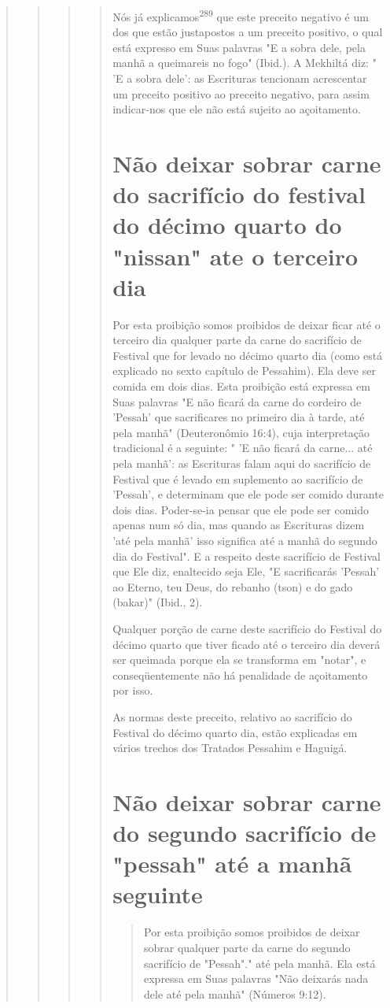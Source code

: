 \begin{quote}
\begin{quote}
\begin{quote}
\begin{quote}
Nós já explicamos\textsuperscript{289} que este preceito negativo é um
dos que es­tão justapostos a um preceito positivo, o qual está expresso
em Suas palavras "E a sobra dele, pela manhã a queimareis no fogo"
(Ibid.). A Mekhiltá diz: " 'E a sobra dele': as Escrituras tencionam
acrescentar um preceito positivo ao pre­ceito negativo, para assim
indicar-nos que ele não está sujeito ao açoitamento.

\section{Não deixar sobrar carne do sacrifício do festival do décimo
quarto do "nissan" ate o terceiro dia}

Por esta proibição somos proibidos de deixar ficar até o terceiro dia
qualquer parte da carne do sacrifício de Festival que for levado no
décimo quarto dia (como está explicado no sexto capítulo de Pessahim).
Ela deve ser comida em dois dias. Esta proibição está expressa em Suas
palavras "E não ficará da carne do cordeiro de 'Pessah' que sacrificares
no primeiro dia à tarde, até pela manhã" (Deuteronômio 16:4), cuja
interpretação tradicional é a seguinte: " 'E não ficará da carne... até
pela manhã': as Escrituras falam aqui do sacrifício de Festival que é
levado em suplemento ao sacrifício de 'Pessah', e determinam que ele
pode ser comido durante dois dias. Poder-se-ia pensar que ele pode ser
comido apenas num só dia, mas quando as Escrituras dizem 'até pela
manhã' isso significa até a manhã do segundo dia do Festival". E a
respeito deste sacri­fício de Festival que Ele diz, enaltecido seja Ele,
"E sacrificarás 'Pessah' ao Eter­no, teu Deus, do rebanho (tson) e do
gado (bakar)" (Ibid., 2).

Qualquer porção de carne deste sacrifício do Festival do décimo quar­to
que tiver ficado até o terceiro dia deverá ser queimada porque ela se
trans­forma em "notar", e conseqüentemente não há penalidade de
açoitamento por isso.

As normas deste preceito, relativo ao sacrifício do Festival do déci­mo
quarto dia, estão explicadas em vários trechos dos Tratados Pessahim e
Haguigá.

\section{Não deixar sobrar carne do segundo sacrifício de "pessah" até a manhã seguinte}

\begin{quote}
Por esta proibição somos proibidos de deixar sobrar qualquer parte da
carne do segundo sacrifício de "Pessah"." até pela
manhã. Ela está expressa em Suas palavras "Não deixarás nada dele até
pela manhã" (Números 9:12).


\end{quote}
\end{quote}
\end{quote}
\end{quote}
\end{quote}
